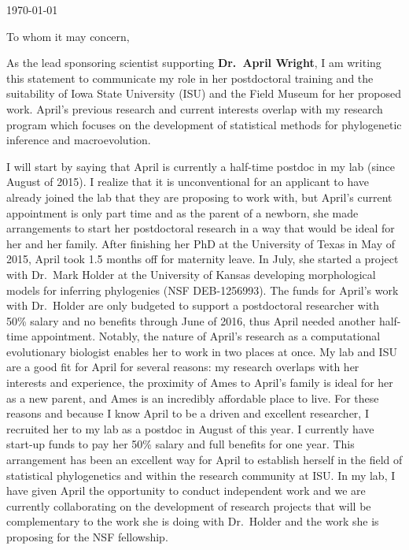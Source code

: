 \documentclass[11pt]{article}
\begin{document}
\thispagestyle{fancy}
\begin{flushright}
\today
\end{flushright}
\vspace{2mm}



\noindent To whom it may concern,

As the lead sponsoring scientist supporting \textbf{Dr.\ April Wright}, I am writing this statement to communicate my role in her postdoctoral training and the suitability of Iowa State University (ISU) and the Field Museum for her proposed work. 
April's previous research and current interests overlap with my research program which focuses on the development of statistical methods for phylogenetic inference and macroevolution. %

I will start by saying that April is currently a half-time postdoc in my lab (since August of 2015). 
I realize that it is unconventional for an applicant to have already joined the lab that they are proposing to work with, but April's current appointment is only part time and as the parent of a newborn, she made arrangements to start her postdoctoral research in a way that would be ideal for her and her family. 
After finishing her PhD at the University of Texas in May of 2015, April took 1.5 months off for maternity leave.
In July, she started a project with Dr.\ Mark Holder at the University of Kansas developing morphological models for inferring phylogenies (NSF DEB-1256993). 
The funds for April's work with Dr.\ Holder are only budgeted to support a postdoctoral researcher with 50\% salary and no benefits through June of 2016, thus April needed another half-time appointment. 
Notably, the nature of April's research as a computational evolutionary biologist enables her to work in two places at once. 
My lab and ISU are a good fit for April for several reasons: my research overlaps with her interests and experience, the proximity of Ames to April's family is ideal for her as a new parent, and Ames is an incredibly affordable place to live. 
For these reasons and because I know April to be a driven and excellent researcher, I recruited her to my lab as a postdoc in August of this year.
I currently have start-up funds to pay her 50\% salary and full benefits for one year.  
This arrangement has been an excellent way for April to establish herself in the field of statistical phylogenetics and within the research community at ISU. 
In my lab, I have given April the opportunity to conduct independent work and we are currently collaborating on the development of research projects that will be complementary to the work she is doing with Dr.\ Holder and the work she is proposing for the NSF fellowship.
\end{document}
